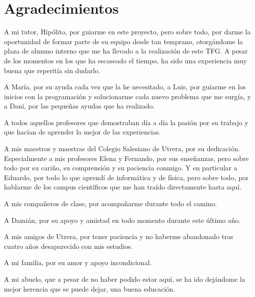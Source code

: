 \chapter*{Agradecimientos}
\pagestyle{empty}

\lettrine[lraise=-0.1, lines=2, loversize=0.25]{}{}
A mi tutor, Hipólito, por guiarme en este proyecto, pero sobre todo, por darme la
oportunidad de formar parte de su equipo desde tan temprano, otorgándome la plaza
de alumno interno que me ha llevado a la realización de este TFG. A pesar de los 
momentos en los que ha escaseado el tiempo, ha sido una experiencia muy buena que 
reperitía sin dudarlo.

A María, por su ayuda cada vez que la he necesitado, a Luis, por guiarme en los
inicios con la programación y  solucionarme cada nuevo problema que me surgía, y a
Dani, por las pequeñas ayudas que ha realizado.

A todos aquellos profesores que demostraban día a día la pasión por su trabajo 
y que hacían de aprender la mejor de las experiencias.

A mis maestros y maestras del Colegio Salesiano de Utrera, por su dedicación.
Especialmente a mis profesores Elena y Fernando, por sus enseñanzas, pero sobre
todo por su cariño, su comprensión y su paciencia conmigo. Y en particular a
Eduardo, por todo lo que aprendí de informática y de física, pero sobre todo, 
por hablarme de los campus científicos que me han traído directamente hasta aquí.

A mis compañeros de clase, por acompañarme durante todo el camino.

A Damián, por su apoyo y amistad en todo momento durante este último año.

A mis amigos de Utrera, por tener paciencia y no haberme abandonado tras cuatro
años desaparecido con mis estudios.

A mi familia, por su amor y apoyo incondicional.

A mi abuelo, que a pesar de no haber podido estar aquí, se ha ido dejándome 
la mejor herencia que se puede dejar, una buena educación.

{}%
\vspace{-.3cm}
{}%
{}%
